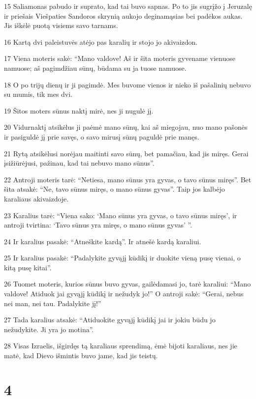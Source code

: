 \par 15 Saliamonas pabudo ir suprato, kad tai buvo sapnas. Po to jis sugrįžo į Jeruzalę ir priešais Viešpaties Sandoros skrynią aukojo deginamąsias bei padėkos aukas. Jis iškėlė puotą visiems savo tarnams. 
\par 16 Kartą dvi paleistuvės atėjo pas karalių ir stojo jo akivaizdon. 
\par 17 Viena moteris sakė: “Mano valdove! Aš ir šita moteris gyvename vienuose namuose; aš pagimdžiau sūnų, būdama su ja tuose namuose. 
\par 18 O po trijų dienų ir ji pagimdė. Mes buvome vienos ir nieko iš pašalinių nebuvo su mumis, tik mes dvi. 
\par 19 Šitos moters sūnus naktį mirė, nes ji nugulė jį. 
\par 20 Vidurnaktį atsikėlus ji paėmė mano sūnų, kai aš miegojau, nuo mano pašonės ir pasiguldė jį prie savęs, o savo mirusį sūnų paguldė prie manęs. 
\par 21 Rytą atsikėlusi norėjau maitinti savo sūnų, bet pamačiau, kad jis miręs. Gerai įsižiūrėjusi, pažinau, kad tai nebuvo mano sūnus”. 
\par 22 Antroji moteris tarė: “Netiesa, mano sūnus yra gyvas, o tavo sūnus miręs”. Bet šita atsakė: “Ne, tavo sūnus miręs, o mano sūnus gyvas”. Taip jos kalbėjo karaliaus akivaizdoje. 
\par 23 Karalius tarė: “Viena sako: ‘Mano sūnus yra gyvas, o tavo sūnus miręs’, ir antroji tvirtina: ‘Tavo sūnus yra miręs, o mano sūnus gyvas’ ”. 
\par 24 Ir karalius pasakė: “Atneškite kardą”. Ir atnešė kardą karaliui. 
\par 25 Ir karalius pasakė: “Padalykite gyvąjį kūdikį ir duokite vieną pusę vienai, o kitą pusę kitai”. 
\par 26 Tuomet moteris, kurios sūnus buvo gyvas, gailėdamasi jo, tarė karaliui: “Mano valdove! Atiduok jai gyvąjį kūdikį ir nežudyk jo!” O antroji sakė: “Gerai, nebus nei man, nei tau. Padalykite jį!” 
\par 27 Tada karalius atsakė: “Atiduokite gyvąjį kūdikį jai ir jokiu būdu jo nežudykite. Ji yra jo motina”. 
\par 28 Visas Izraelis, išgirdęs tą karaliaus sprendimą, ėmė bijoti karaliaus, nes jie matė, kad Dievo išmintis buvo jame, kad jis teistų.



\chapter{4}

